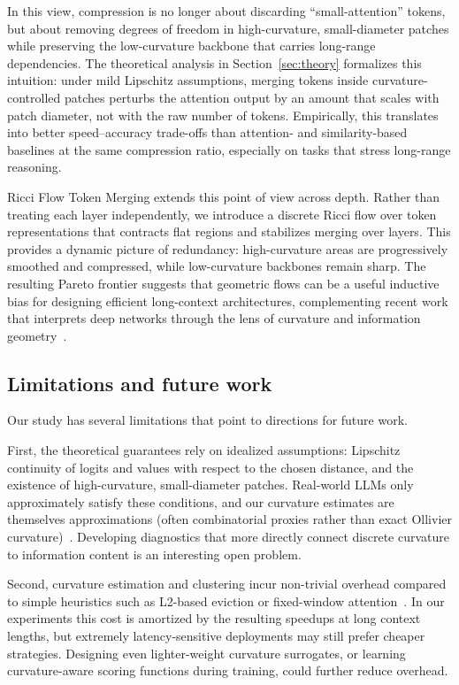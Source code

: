 \documentclass{article}
\theoremstyle{plain}
\theoremstyle{definition}
\theoremstyle{remark}
\begin{document}
In this view, compression is no longer about discarding ``small-attention'' tokens, but about removing degrees of freedom in high-curvature, small-diameter patches while preserving the low-curvature backbone that carries long-range dependencies. The theoretical analysis in Section~\ref{sec:theory} formalizes this intuition: under mild Lipschitz assumptions, merging tokens inside curvature-controlled patches perturbs the attention output by an amount that scales with patch diameter, not with the raw number of tokens. Empirically, this translates into better speed--accuracy trade-offs than attention- and similarity-based baselines at the same compression ratio, especially on tasks that stress long-range reasoning.

Ricci Flow Token Merging extends this point of view across depth. Rather than treating each layer independently, we introduce a discrete Ricci flow over token representations that contracts flat regions and stabilizes merging over layers. This provides a dynamic picture of redundancy: high-curvature areas are progressively smoothed and compressed, while low-curvature backbones remain sharp. The resulting Pareto frontier suggests that geometric flows can be a useful inductive bias for designing efficient long-context architectures, complementing recent work that interprets deep networks through the lens of curvature and information geometry~\citep{baptista2024deep,sadeghzadeh2025curvaturereview,akguller2025information}.

\subsection{Limitations and future work}

Our study has several limitations that point to directions for future work.

First, the theoretical guarantees rely on idealized assumptions: Lipschitz continuity of logits and values with respect to the chosen distance, and the existence of high-curvature, small-diameter patches. Real-world LLMs only approximately satisfy these conditions, and our curvature estimates are themselves approximations (often combinatorial proxies rather than exact Ollivier curvature)~\citep{forman2003bochner,weber2024discrete}. Developing diagnostics that more directly connect discrete curvature to information content is an interesting open problem.

Second, curvature estimation and clustering incur non-trivial overhead compared to simple heuristics such as L2-based eviction or fixed-window attention~\citep{devoto2024l2kv,ge2024fastgen}. In our experiments this cost is amortized by the resulting speedups at long context lengths, but extremely latency-sensitive deployments may still prefer cheaper strategies. Designing even lighter-weight curvature surrogates, or learning curvature-aware scoring functions during training, could further reduce overhead.
\end{document}
